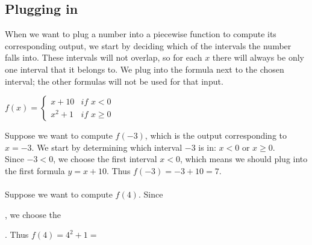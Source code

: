 \documentclass{ximera}
\begin{document}
\subsection*{Plugging in}
When we want to plug a number into a piecewise function to compute its corresponding output, we start by deciding which of the intervals the number falls into. These intervals will not overlap, so for each $x$ there will always be only one interval that it belongs to. We plug into the formula next to the chosen interval; the other formulas will not be used for that input.

\begin{example}
$f(x)=\begin{cases} x+10 & \textit{if }x<0\\x^2+1 & \textit{if } x\geq 0\end{cases}$

Suppose we want to compute $f(-3)$, which is the output corresponding to $x=-3$. We start by determining which interval $-3$ is in: $x<0$ or $x\geq 0$. \\Since $-3<0$, we choose the first interval $x<0$, which means we should plug into the first formula $y=x+10$. Thus $f(-3)=-3+10=7$.
\\
\\Suppose we want to compute $f(4)$. Since 
\begin{multipleChoice}
  \end{multipleChoice}
, we choose the 
\begin{multipleChoice}
  \end{multipleChoice}. Thus $f(4)=4^2+1=$
  \begin{multipleChoice}
  \end{multipleChoice}
\end{example}
\end{document}
